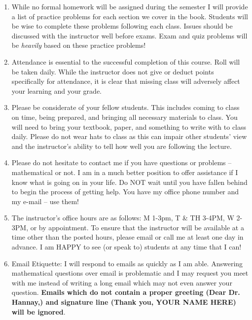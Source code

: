 \documentclass[11pt, a4paper]{article}
\newcommand{\officeHours}{M 1-3pm, T \& TH 3-4PM, W 2-3PM}
\begin{document}
\begin{enumerate}
\item While no formal homework will be assigned during the semester I will provide a list of practice problems for each section we cover in the book. Students will be wise to complete these problems following each class. Issues should be discussed with the instructor well before exams. Exam and quiz  problems will be \textit{heavily} based on these practice problems!
\item Attendance is essential to the successful completion of this course.  Roll will be taken daily.  While the instructor does not give or deduct points specifically for attendance, it is clear that missing class will adversely affect your learning and your grade.
\item Please be considerate of your fellow students.  This includes coming to class on time, being prepared, and bringing all necessary materials to class.  You will need to bring your textbook, paper, and something to write with to class daily.  Please do not wear hats to class as this can impair other students’ view and the instructor's ability to tell how well you are following the lecture.
\item Please do not hesitate to contact me if you have questions or problems – mathematical or not.  I am in a much better position to offer assistance if I know what is going on in your life.  Do NOT wait until you have fallen behind to begin the process of getting help.  You have my office phone number and my e-mail – use them! 
\item The instructor’s office hours are as follows: \officeHours, or by appointment.  To ensure that the instructor will be available at a time other than the posted hours, please email or call me at least one day in advance.  I am HAPPY to see (or speak to) students at any time that I can!
\item Email Etiquette: I will respond to emails as quickly as I am able. Answering mathematical questions over email is problematic and I may request you meet with me instead of writing a long email which may not even answer your question. \textbf{Emails which do not contain a proper greeting (Dear Dr. Hannay,) and signature line (Thank you, YOUR NAME HERE) will be ignored}. 
\end{enumerate}
\end{document}

